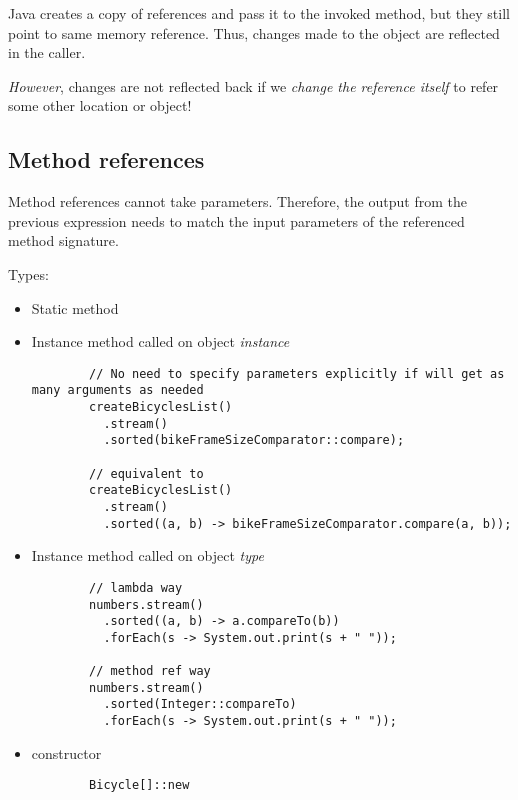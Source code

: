 \documentclass{scrartcl}
\begin{document}
    Java creates a copy of references and pass it to the invoked method,     but they still point to same memory reference. Thus, changes made to the object are reflected in the caller.

    \textit{However}, changes are not reflected back if we \textit{change the reference itself} to refer some other location or object!


\subsection{Method references}

    Method references cannot take parameters. Therefore, the output from the previous expression needs to match the input parameters of the referenced method signature.

    Types:
    \begin{itemize}
        \item Static method
        \item Instance method called on object \textit{instance}

        \begin{lstlisting}
        // No need to specify parameters explicitly if will get as many arguments as needed
        createBicyclesList()
          .stream()
          .sorted(bikeFrameSizeComparator::compare);

        // equivalent to
        createBicyclesList()
          .stream()
          .sorted((a, b) -> bikeFrameSizeComparator.compare(a, b));
        \end{lstlisting}

        \item Instance method called on object \textit{type}

        \begin{lstlisting}
        // lambda way
        numbers.stream()
          .sorted((a, b) -> a.compareTo(b))
          .forEach(s -> System.out.print(s + " "));

        // method ref way
        numbers.stream()
          .sorted(Integer::compareTo)
          .forEach(s -> System.out.print(s + " "));
        \end{lstlisting}

        \item  constructor

        \begin{lstlisting}
        Bicycle[]::new
        \end{lstlisting}

    \end{itemize}
\end{document}
